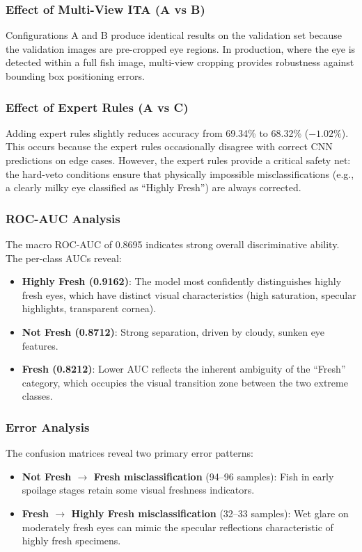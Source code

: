 \documentclass[conference]{IEEEtran}
\begin{document}
\subsubsection{Effect of Multi-View ITA (A vs B)}
Configurations A and B produce identical results on the validation set because the validation images are pre-cropped eye regions. In production, where the eye is detected within a full fish image, multi-view cropping provides robustness against bounding box positioning errors.

\subsubsection{Effect of Expert Rules (A vs C)}
Adding expert rules slightly reduces accuracy from 69.34\% to 68.32\% ($-1.02\%$). This occurs because the expert rules occasionally disagree with correct CNN predictions on edge cases. However, the expert rules provide a critical safety net: the hard-veto conditions ensure that physically impossible misclassifications (e.g., a clearly milky eye classified as ``Highly Fresh'') are always corrected.

\subsubsection{ROC-AUC Analysis}
The macro ROC-AUC of 0.8695 indicates strong overall discriminative ability. The per-class AUCs reveal:
\begin{itemize}[leftmargin=*]
    \item \textbf{Highly Fresh (0.9162)}: The model most confidently distinguishes highly fresh eyes, which have distinct visual characteristics (high saturation, specular highlights, transparent cornea).
    \item \textbf{Not Fresh (0.8712)}: Strong separation, driven by cloudy, sunken eye features.
    \item \textbf{Fresh (0.8212)}: Lower AUC reflects the inherent ambiguity of the ``Fresh'' category, which occupies the visual transition zone between the two extreme classes.
\end{itemize}

\subsubsection{Error Analysis}
The confusion matrices reveal two primary error patterns:
\begin{itemize}[leftmargin=*]
    \item \textbf{Not Fresh $\to$ Fresh misclassification} (94--96 samples): Fish in early spoilage stages retain some visual freshness indicators.
    \item \textbf{Fresh $\to$ Highly Fresh misclassification} (32--33 samples): Wet glare on moderately fresh eyes can mimic the specular reflections characteristic of highly fresh specimens.
\end{itemize}
\end{document}
